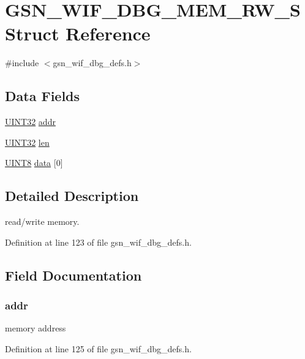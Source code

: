\hypertarget{a00331}{
\section{GSN\_\-WIF\_\-DBG\_\-MEM\_\-RW\_\-S Struct Reference}
\label{a00331}
}


{\ttfamily \#include $<$gsn\_\-wif\_\-dbg\_\-defs.h$>$}

\subsection*{Data Fields}
\begin{DoxyCompactItemize}
\item 
\hyperlink{a00660_gae1e6edbbc26d6fbc71a90190d0266018}{UINT32} \hyperlink{a00331_a211571ed47a0fee2d898236395234dab}{addr}
\item 
\hyperlink{a00660_gae1e6edbbc26d6fbc71a90190d0266018}{UINT32} \hyperlink{a00331_ab9abc6ede61238a05664f9c37e4412c3}{len}
\item 
\hyperlink{a00660_gab27e9918b538ce9d8ca692479b375b6a}{UINT8} \hyperlink{a00331_a29500e452cff835f2b70d1dff36f918a}{data} \mbox{[}0\mbox{]}
\end{DoxyCompactItemize}


\subsection{Detailed Description}
read/write memory. 

Definition at line 123 of file gsn\_\-wif\_\-dbg\_\-defs.h.



\subsection{Field Documentation}
\hypertarget{a00331_a211571ed47a0fee2d898236395234dab}{
\subsubsection[{addr}]{ {\bf addr}}}
\label{a00331_a211571ed47a0fee2d898236395234dab}
memory address 

Definition at line 125 of file gsn\_\-wif\_\-dbg\_\-defs.h.

